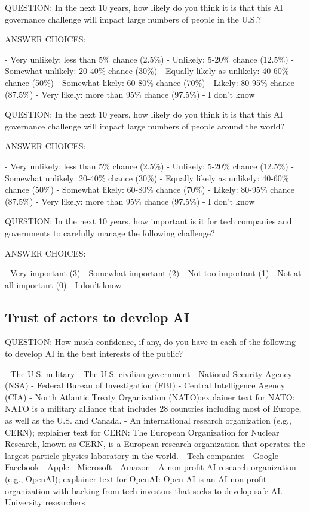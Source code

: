 \documentclass{article}
\begin{document}
\noindent QUESTION: In the next 10 years, how likely do you think it is that this AI governance challenge will impact large numbers of people in the U.S.?

\noindent ANSWER CHOICES:

-  Very unlikely: less than 5\% chance (2.5\%)
-  Unlikely: 5-20\% chance (12.5\%)
-  Somewhat unlikely: 20-40\% chance (30\%)
-  Equally likely as unlikely: 40-60\% chance (50\%)
-  Somewhat likely: 60-80\% chance (70\%)
-  Likely: 80-95\% chance (87.5\%)
-  Very likely: more than 95\% chance (97.5\%)
-  I don’t know

\noindent QUESTION: In the next 10 years, how likely do you think it is that this AI governance challenge will impact large numbers of people around the world?

\noindent ANSWER CHOICES:

-  Very unlikely: less than 5\% chance (2.5\%)
-  Unlikely: 5-20\% chance (12.5\%)
-  Somewhat unlikely: 20-40\% chance (30\%)
-  Equally likely as unlikely: 40-60\% chance (50\%)
-  Somewhat likely: 60-80\% chance (70\%)
-  Likely: 80-95\% chance (87.5\%)
-  Very likely: more than 95\% chance (97.5\%)
-  I don’t know

\noindent QUESTION: In the next 10 years, how important is it for tech companies and governments to carefully manage the following challenge?

\noindent ANSWER CHOICES:

-  Very important (3)
-  Somewhat important (2)
-  Not too important (1)
-  Not at all important (0)
-  I don’t know

\subsection{Trust of actors to develop AI}

\noindent QUESTION: How much confidence, if any, do you have in each of the following to develop AI in the best interests of the public?


-  The U.S. military
-  The U.S. civilian government
-  National Security Agency (NSA)
-  Federal Bureau of Investigation (FBI)
-  Central Intelligence Agency (CIA)
-  North Atlantic Treaty Organization (NATO);explainer text for NATO: NATO is a military alliance that includes 28 countries including most of Europe, as well as the U.S. and Canada.
-  An international research organization (e.g., CERN); explainer text for CERN: The European Organization for Nuclear Research, known as CERN, is a European research organization that operates the largest particle physics laboratory in the world.
-  Tech companies
-  Google
-  Facebook
-  Apple
-  Microsoft
-  Amazon
-  A non-profit AI research organization (e.g., OpenAI); explainer text for OpenAI: Open AI is an AI non-profit organization with backing from tech investors that seeks to develop safe AI. University researchers
\end{document}
